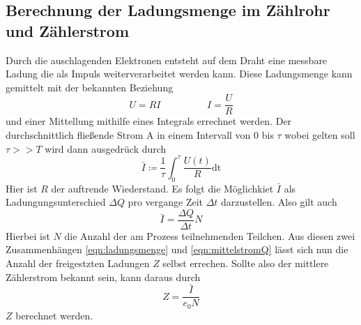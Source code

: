 \subsection{Berechnung der Ladungsmenge im Zählrohr und Zählerstrom}
Durch die auschlagenden Elektronen entsteht auf dem Draht eine messbare Ladung die als Impuls weiterverarbeitet werden kann.
Diese Ladungsmenge kann gemittelt mit der bekannten Beziehung
\begin{equation*}
U=RI \hspace{2cm} I=\frac{U}{R}
\end{equation*}
und einer Mittellung mithilfe eines Integrals errechnet werden.
Der durchschnittlich fließende Strom $\si{\ampere}$ in einem Intervall von $0$ bis $\tau$ wobei gelten soll $\tau>>T$ wird dann ausgedrück durch
\begin{equation}
\label{eqn:ladungsmenge}
\bar{\si{I}} \coloneqq \frac{1}{\tau} \int_{0}^{\tau} \frac{U(t)}{R} \text{dt}
\end{equation}
Hier ist $R$ der auftrende Wiederstand. 
Es folgt die Möglichkiet $\bar{\si{I}}$ als Ladungungsunterschied $\Delta \si{Q}$ pro vergange Zeit $\Delta \si{t}$ darzustellen. 
Also gilt auch
\begin{equation}
\label{eqn:mittelstromQ}
\bar{\si{I}} = \frac{\Delta \si{Q}}{\Delta\si{t}}\si{N}
\end{equation}  
Hierbei ist $\si{N}$ die Anzahl der am Prozess teilnehmenden Teilchen.
Aus diesen zwei Zusammenhängen \eqref{eqn:ladungsmenge} und \eqref{eqn:mittelstromQ} lässt sich nun die Anzahl der freigestzten Ladungen $\si{Z}$
selbst errechen. Sollte also der mittlere Zählerstrom bekannt sein, kann daraus durch 
\begin{equation}
\label{eqn:teilchen}
\si{Z} = \frac{\bar{\si{I}}}{e_0N}
\end{equation}
$\si{Z}$ berechnet werden.

